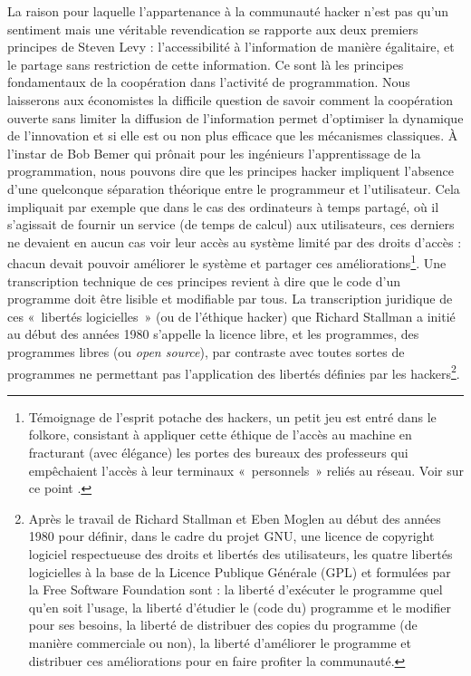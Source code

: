 \documentclass{FramateX}
\begin{document}
\begin{refsection}
La raison pour laquelle l'appartenance à la communauté hacker n'est pas
qu'un sentiment mais une véritable revendication se rapporte aux deux
premiers principes de Steven Levy : l'accessibilité à l'information de
manière égalitaire, et le partage sans restriction de cette
information. Ce sont là les principes fondamentaux de la coopération
dans l'activité de programmation. Nous laisserons aux économistes la
difficile question de savoir comment la coopération ouverte sans
limiter la diffusion de l'information permet d'optimiser la dynamique
de l'innovation et si elle est ou non plus efficace que les mécanismes
classiques. À l'instar de Bob Bemer qui prônait pour les ingénieurs
l'apprentissage de la programmation, nous pouvons dire que les
principes hacker impliquent l'absence d'une quelconque séparation
théorique entre le programmeur et l'utilisateur. Cela impliquait par
exemple que dans le cas des ordinateurs à temps partagé, où il
s'agissait de fournir un service (de temps de calcul) aux utilisateurs,
ces derniers ne devaient en aucun cas voir leur accès au système limité
par des droits d'accès : chacun devait pouvoir améliorer le système et
partager ces améliorations\footnote{Témoignage de l'esprit potache
des hackers, un petit jeu est entré dans le folkore, consistant à
appliquer cette éthique de l'accès au machine en fracturant (avec
élégance) les portes des bureaux des professeurs qui empêchaient
l'accès à leur terminaux «~personnels~» reliés au réseau. Voir sur ce
point \cite[pp.~64-65]{williamsrichard2010}.}. Une transcription technique de
ces principes revient à dire que le code d'un programme doit être
lisible et modifiable par tous. La transcription juridique de ces
«~libertés logicielles~» (ou de l'éthique hacker) que Richard Stallman
a initié au début des années 1980 s'appelle la licence libre, et les
programmes, des programmes libres (ou \textit{open source}), par
contraste avec toutes sortes de programmes ne permettant pas
l'application des libertés définies par les hackers\footnote{Après le
travail de Richard Stallman et Eben Moglen au début des années 1980
pour définir, dans le cadre du projet GNU, une licence de copyright
logiciel respectueuse des droits et libertés des utilisateurs, les
quatre libertés logicielles à la base de la Licence Publique Générale
(GPL) et formulées par la Free Software Foundation sont : la liberté
d'exécuter le programme quel qu'en soit l'usage, la
liberté d'étudier le (code du) programme et le modifier pour ses
besoins, la liberté de distribuer des copies du programme (de manière
commerciale ou non), la liberté d'améliorer le programme et distribuer
ces améliorations pour en faire profiter la communauté.}.


\end{refsection}
\end{document}

